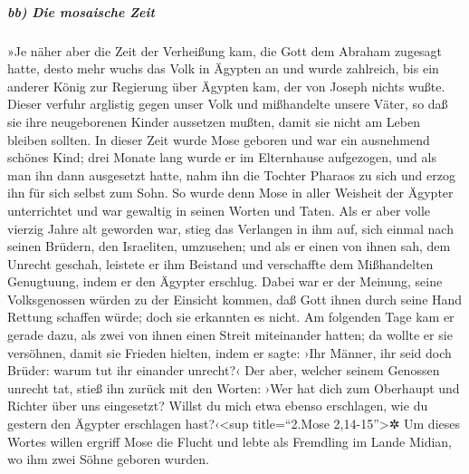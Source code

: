 \hypertarget{bb-die-mosaische-zeit}{%
\subparagraph{bb) Die mosaische Zeit}\label{bb-die-mosaische-zeit}}

 »Je näher aber die Zeit der Verheißung kam, die Gott dem
Abraham zugesagt hatte, desto mehr wuchs das Volk in Ägypten an und
wurde zahlreich,  bis ein anderer König zur Regierung
über Ägypten kam, der von Joseph nichts wußte.  Dieser
verfuhr arglistig gegen unser Volk und mißhandelte unsere Väter, so daß
sie ihre neugeborenen Kinder aussetzen mußten, damit sie nicht am Leben
bleiben sollten.  In dieser Zeit wurde Mose geboren und
war ein ausnehmend schönes Kind; drei Monate lang wurde er im
Elternhause aufgezogen,  und als man ihn dann ausgesetzt
hatte, nahm ihn die Tochter Pharaos zu sich und erzog ihn für sich
selbst zum Sohn.  So wurde denn Mose in aller Weisheit
der Ägypter unterrichtet und war gewaltig in seinen Worten und Taten.
 Als er aber volle vierzig Jahre alt geworden war, stieg
das Verlangen in ihm auf, sich einmal nach seinen Brüdern, den
Israeliten, umzusehen;  und als er einen von ihnen sah,
dem Unrecht geschah, leistete er ihm Beistand und verschaffte dem
Mißhandelten Genugtuung, indem er den Ägypter erschlug. 
Dabei war er der Meinung, seine Volksgenossen würden zu der Einsicht
kommen, daß Gott ihnen durch seine Hand Rettung schaffen würde; doch sie
erkannten es nicht.  Am folgenden Tage kam er gerade
dazu, als zwei von ihnen einen Streit miteinander hatten; da wollte er
sie versöhnen, damit sie Frieden hielten, indem er sagte: ›Ihr Männer,
ihr seid doch Brüder: warum tut ihr einander unrecht?‹ 
Der aber, welcher seinem Genossen unrecht tat, stieß ihn zurück mit den
Worten: ›Wer hat dich zum Oberhaupt und Richter über uns eingesetzt?
 Willst du mich etwa ebenso erschlagen, wie du gestern
den Ägypter erschlagen hast?‹\textless sup title=``2.Mose
2,14-15''\textgreater✲  Um dieses Wortes willen ergriff
Mose die Flucht und lebte als Fremdling im Lande Midian, wo ihm zwei
Söhne geboren wurden.

